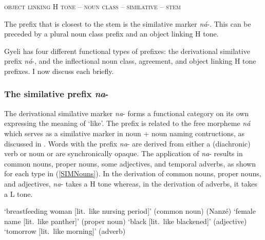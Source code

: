 \begin{exe}
\ex \label{Prefix-extent} \textsc{object linking H tone -- noun class -- similative -- stem}
\end{exe}

\noindent The prefix that is closest to the stem is the similative marker {\itshape ná}-. This can be preceded by a plural noun class prefix and an object linking H tone. 

Gyeli has four different functional types of prefixes: the derivational similative prefix {\itshape ná}-, and the inflectional noun class, agreement, and object linking H tone prefixes. I now discuss each briefly.



\subsubsection{The similative prefix {\itshape na}-} 
\label{sec:SIM}

The derivational similative marker {\itshape na}- forms a functional category on its own expressing the meaning of `like'. The prefix is related to the free morpheme {\itshape ná} which serves as a similative marker in noun + noun naming contructions, as discussed in . Words with the prefix {\itshape na}- are derived from  either a (diachronic) verb or noun or are synchronically opaque.  The application of {\itshape na}- results in common nouns, proper nouns,  some adjectives, and temporal adverbs, as shown for each type in (\ref{SIMNouns}). In the derivation of common nouns, proper nouns, and adjectives, {\itshape na}- takes a H tone whereas, in the derivation of adverbs, it takes a L tone.


\begin{exe}
\ex\label{SIMNouns}
\begin{xlist}
 `breastfeeding woman [lit.\ like nursing period]' (common noun)
 (Nanzé) `female name [lit.\ like panther]' (proper noun)
 `black [lit.\ like blackened]' (adjective)
 `tomorrow [lit.\ like morning]' (adverb)
\end{xlist}
\end{exe}

